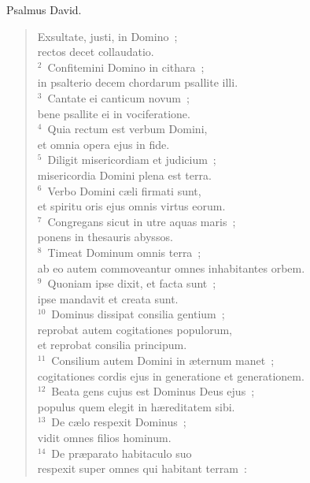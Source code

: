 \bchapter
\lettrine[lines=3,image=true,loversize=0.05,lraise=-0.03]{P}{}salmus David. \begin{flushleft}\begin{verse}\vspace{6pt}Exsultate, justi, in Domino~;\\ rectos decet collaudatio.\\
${}^{2}$~Confitemini Domino in cithara~;\\ in psalterio decem chordarum psallite illi.\\
${}^{3}$~Cantate ei canticum novum~;\\ bene psallite ei in vociferatione.\\
${}^{4}$~Quia rectum est verbum Domini,\\ et omnia opera ejus in fide.\\
${}^{5}$~Diligit misericordiam et judicium~;\\ misericordia Domini plena est terra.\\
${}^{6}$~Verbo Domini c\ae li firmati sunt,\\ et spiritu oris ejus omnis virtus eorum.\\
${}^{7}$~Congregans sicut in utre aquas maris~;\\ ponens in thesauris abyssos.\\
${}^{8}$~Timeat Dominum omnis terra~;\\ ab eo autem commoveantur omnes inhabitantes orbem.\\
${}^{9}$~Quoniam ipse dixit, et facta sunt~;\\ ipse mandavit et creata sunt.\\
${}^{10}$~Dominus dissipat consilia gentium~;\\ reprobat autem cogitationes populorum,\\ et reprobat consilia principum.\\
${}^{11}$~Consilium autem Domini in \ae ternum manet~;\\ cogitationes cordis ejus in generatione et generationem.\\
${}^{12}$~Beata gens cujus est Dominus Deus ejus~;\\ populus quem elegit in h\ae reditatem sibi.\\
${}^{13}$~De c\ae lo respexit Dominus~;\\ vidit omnes filios hominum.\\
${}^{14}$~De pr\ae parato habitaculo suo\\ respexit super omnes qui habitant terram~:\\

\end{verse}
\end{flushleft}
